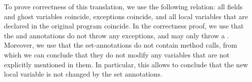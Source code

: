 To prove correctness of this translation, we use the following
relation: all fields and ghost variables coincide, exceptions
coincide, and all local variables that are declared in the original
program coincide. In the correctness proof, we use that the \postset
and \excset annotations do not throw any exceptions, and \preset may only
throw a \JMLExc. Moreover, we use that the set-annotations do not
contain method calls, from which we can conclude that they do not
modify any variables that are not explicitly mentioned in them. In
particular, this allows to conclude that the new local variable is
not changed by the set annotations.
